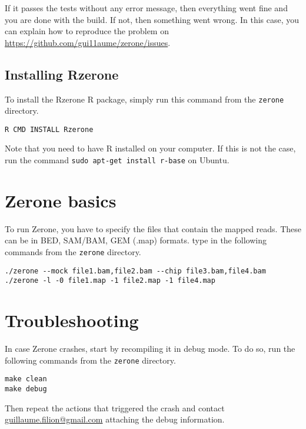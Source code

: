 \documentclass[12pt]{article}
\begin{document}
If it passes the tests without any error message, then everything went fine
and you are done with the build. If not, then something went
wrong. In this case, you can explain how to reproduce the problem
on \url{https://github.com/gui11aume/zerone/issues}.

\subsection{Installing Rzerone}

To install the Rzerone R package, simply run this command from the
\texttt{zerone} directory.

\begin{verbatim}
R CMD INSTALL Rzerone
\end{verbatim}

Note that you need to have R installed on your computer. If this is not the
case, run the command \texttt{sudo apt-get install r-base} on Ubuntu.

\section{Zerone basics}

To run Zerone, you have to specify the files that contain the mapped reads.
These can be in BED, SAM/BAM, GEM (.map) formats.
type in the following commands from the \texttt{zerone} directory.

\begin{verbatim}
./zerone --mock file1.bam,file2.bam --chip file3.bam,file4.bam
./zerone -l -0 file1.map -1 file2.map -1 file4.map
\end{verbatim}

\section{Troubleshooting}

In case Zerone crashes, start by recompiling it in debug mode. To do so,
run the following commands from the \texttt{zerone} directory.

\begin{verbatim}
make clean
make debug
\end{verbatim}

Then repeat the actions that triggered the crash and contact
\href{mailto:guillaume.filion@gmail.com}{guillaume.filion@gmail.com}
attaching the debug information.

\end{document}
